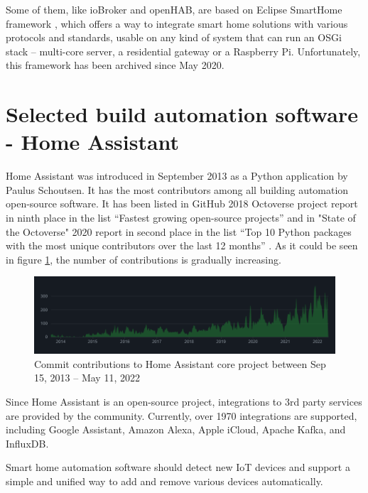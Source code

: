 \documentclass[fleqn,10pt]{olplainarticle}
\begin{document}
Some of them, like ioBroker and openHAB, are based on Eclipse SmartHome framework \cite{EclipseSmartHomeProject}, which offers a way to integrate smart home solutions with various protocols and standards, usable on any kind of system that can run an OSGi stack – multi-core server, a residential gateway or a Raspberry Pi. Unfortunately, this framework has been archived since May 2020.

\section{Selected build automation software - Home Assistant}

Home Assistant was introduced in September 2013 as a Python application by Paulus Schoutsen. It has the most contributors among all building automation open-source software. It has been listed in GitHub 2018 Octoverse project report in ninth place in the list “Fastest growing open-source projects” and in "State of the Octoverse" 2020 report in second place in the list “Top 10 Python packages with the most unique contributors over the last 12 months” \cite{GitHubStateOfTheOctoverse}. As it could be seen in figure \ref{fig:figure2}, the number of contributions is gradually increasing.

\begin{figure}[ht]
    \centering
    \includegraphics[width=1\linewidth]{images/contributors - hassio.png}
    \caption{Commit contributions to Home Assistant core project between Sep 15, 2013 – May 11, 2022 \cite{HassioContributors2013-2022}}
    \label{fig:figure2}
\end{figure}

Since Home Assistant is an open-source project, integrations to 3rd party services are provided by the community. Currently, over 1970 integrations are supported, including Google Assistant, Amazon Alexa, Apple iCloud, Apache Kafka, and InfluxDB.

\vskip10pt

Smart home automation software should detect new IoT devices and support a simple and unified way to add and remove various devices automatically.
\end{document}
